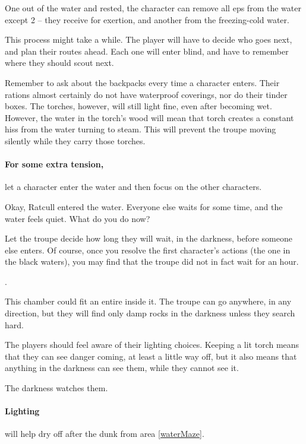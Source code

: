 \begin{multicols}{2}
One out of the water and rested, the character can remove all \glspl{ep} from the water except 2 -- they receive  for exertion, and another from the freezing-cold water.

This process might take a while.
The player will have to decide who goes next, and plan their routes ahead.
Each one will enter blind, and have to remember where they should scout next.

Remember to ask about the backpacks every time a character enters.
Their rations almost certainly do not have waterproof coverings, nor do their tinder boxes.
The torches, however, will still light fine, even after becoming wet.
However, the water in the torch's wood will mean that torch creates a constant hiss from the water turning to steam.
This will prevent the troupe moving silently while they carry those torches.

\paragraph{For some extra tension,}
let a character enter the water and then focus on the other characters.

\begin{speechtext}
  Okay, Ratcull entered the water.
  Everyone else waits for some time, and the water feels quiet.
  What do you do now?
\end{speechtext}

Let the troupe decide how long they will wait, in the darkness, before someone else enters.
Of course, once you resolve the first character's actions (the one in the black waters), you may find that the troupe did not in fact wait for an hour.

.


This chamber could fit an entire  inside it.
The troupe can go anywhere, in any direction, but they will find only damp rocks in the darkness unless they search hard.

The players should feel aware of their lighting choices.
Keeping a lit torch means that they can see danger coming, at least a little way off, but it also means that anything in the darkness can see them, while they cannot see it.

The darkness watches them.

\paragraph{Lighting }
will help dry off after the dunk from area \ref{waterMaze}.


\end{multicols}

